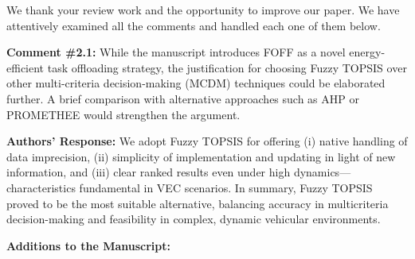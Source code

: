 \begin{center}
\end{center}

\vspace{0.5cm}

We thank your review work and the opportunity to improve our paper. We have attentively examined all the comments and handled each one of them below.

\begin{mdframed}[style=review] 
\textbf{Comment \#2.1:} While the manuscript introduces FOFF as a novel energy-efficient task offloading strategy, the justification for choosing Fuzzy TOPSIS over other multi-criteria decision-making (MCDM) techniques could be elaborated further. A brief comparison with alternative approaches such as AHP or PROMETHEE would strengthen the argument.
\end{mdframed}

\textbf{Authors' Response:} 
We adopt Fuzzy TOPSIS for offering (i) native handling of data imprecision, (ii) simplicity of implementation and updating in light of new information, and (iii) clear ranked results even under high dynamics—characteristics fundamental in VEC scenarios. In summary, Fuzzy TOPSIS proved to be the most suitable alternative, balancing accuracy in multicriteria decision-making and feasibility in complex, dynamic vehicular environments.

\textbf{Additions to the Manuscript:} 


